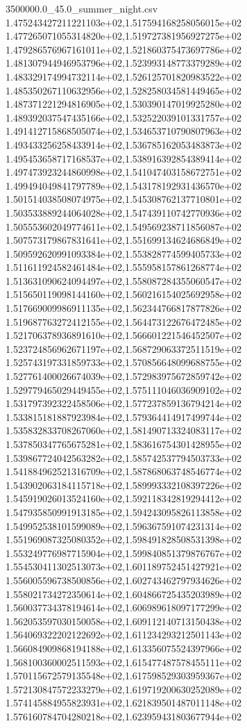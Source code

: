 \begin{filecontents*}{3500000.0_45.0_summer_night.csv}
1.475243427211221103e+02,1.517594168258056015e+02
1.477265071055314820e+02,1.519727381956927275e+02
1.479286576967161011e+02,1.521860375473697786e+02
1.481307944946953796e+02,1.523993148773379289e+02
1.483329174994732114e+02,1.526125701820983522e+02
1.485350267110632956e+02,1.528258034581449465e+02
1.487371221294816905e+02,1.530390147019925280e+02
1.489392037547435166e+02,1.532522039101331757e+02
1.491412715868505074e+02,1.534653710790807963e+02
1.493433256258433914e+02,1.536785162053483873e+02
1.495453658717168537e+02,1.538916392854389414e+02
1.497473923244860998e+02,1.541047403158672751e+02
1.499494049841797789e+02,1.543178192931436570e+02
1.501514038508074975e+02,1.545308762137710801e+02
1.503533889244064028e+02,1.547439110742770936e+02
1.505553602049774611e+02,1.549569238711856087e+02
1.507573179867831641e+02,1.551699134624686849e+02
1.509592620991093384e+02,1.553828774599405733e+02
1.511611924582461484e+02,1.555958157861268774e+02
1.513631090624094497e+02,1.558087284355060547e+02
1.515650119098144160e+02,1.560216154025692958e+02
1.517669009986911135e+02,1.562344766817877826e+02
1.519687763272412155e+02,1.564473122676472485e+02
1.521706378936891610e+02,1.566601221546452507e+02
1.523724856962671197e+02,1.568729063372511519e+02
1.525743197331859733e+02,1.570856648099688755e+02
1.527761400026674039e+02,1.572983975672859742e+02
1.529779465029449455e+02,1.575111046036909102e+02
1.531797392322458506e+02,1.577237859136794214e+02
1.533815181887923984e+02,1.579364414917499744e+02
1.535832833708267060e+02,1.581490713324083117e+02
1.537850347765675281e+02,1.583616754301428955e+02
1.539867724042563282e+02,1.585742537794503733e+02
1.541884962521316709e+02,1.587868063748546774e+02
1.543902063184115718e+02,1.589993332108397226e+02
1.545919026013524160e+02,1.592118342819294412e+02
1.547935850991913185e+02,1.594243095826113858e+02
1.549952538101599089e+02,1.596367591074231314e+02
1.551969087325080352e+02,1.598491828508531398e+02
1.553249776987715904e+02,1.599840851379876767e+02
1.554530411302513073e+02,1.601189752451427921e+02
1.556005596738500856e+02,1.602743462797934626e+02
1.558021734272350614e+02,1.604866725435203989e+02
1.560037734378194614e+02,1.606989618097177299e+02
1.562053597030150058e+02,1.609112140713150438e+02
1.564069322202122692e+02,1.611234293212501143e+02
1.566084909868194188e+02,1.613356075524397966e+02
1.568100360002511593e+02,1.615477487578455111e+02
1.570115672579135548e+02,1.617598529303959367e+02
1.572130847572233279e+02,1.619719200630252089e+02
1.574145884955823931e+02,1.621839501487011148e+02
1.576160784704280218e+02,1.623959431803677944e+02

\end{filecontents*}
